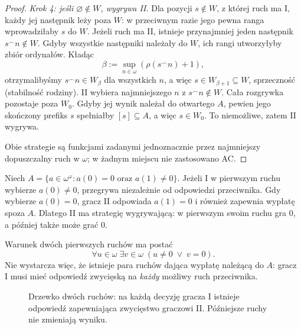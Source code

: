 \begin{proof}
\emph{Krok 4: jeśli $\varnothing\notin W$,
wygrywa II.}
Dla pozycji $s\notin W$, z której
ruch ma I, każdy jej następnik
leży poza $W$: w przeciwnym razie
jego pewna ranga wprowadziłaby
$s$ do $W$.
Jeżeli ruch ma II, istnieje
przynajmniej jeden następnik
$s^\frown n\notin W$.
Gdyby wszystkie następniki należały
do $W$, ich rangi utworzyłyby
zbiór ordynałów. Kładąc
\[
\beta:=\sup_{n\in\omega}
              (\rho(s^\frown n)+1),
\]
otrzymalibyśmy
$s^\frown n\in W_\beta$
dla wszystkich $n$, a więc
$s\in W_{\beta+1}\subseteq W$,
sprzeczność (stabilność rodziny).
II wybiera najmniejszego $n$
z $s^\frown n\notin W$.
Cała rozgrywka pozostaje poza $W_0$.
Gdyby jej wynik należał do
otwartego $A$, pewien jego
skończony prefiks $s$ spełniałby
$[s]\subseteq A$,
a więc $s\in W_0$.
To niemożliwe, zatem II wygrywa.

Obie strategie są funkcjami
zadanymi jednoznacznie przez
najmniejszy dopuszczalny ruch
w $\omega$; w żadnym miejscu
nie zastosowano AC.
\end{proof}

\begin{przyklad}
\label{ex:ad-two-step-quantifiers}
Niech
$A=\{a\in\omega^\omega:a(0)=0
\text{ oraz }a(1)\ne0\}$.
Jeżeli I w pierwszym ruchu wybierze
$a(0)\ne0$, przegrywa niezależnie od
odpowiedzi przeciwnika. Gdy wybierze
$a(0)=0$, gracz II odpowiada $a(1)=0$
i również zapewnia wypłatę spoza $A$.
Dlatego II ma strategię wygrywającą:
w pierwszym swoim ruchu gra $0$,
a później także może grać $0$.

Warunek dwóch pierwszych ruchów ma postać
\[
\forall u\in\omega\;\exists v\in\omega\;
   (u\ne0\;\lor\;v=0).
\]
Nie wystarcza więc, że istnieje para
ruchów dająca wypłatę należącą do $A$:
gracz I musi mieć odpowiedź zwycięską
na \emph{każdy} możliwy ruch przeciwnika.
\end{przyklad}
\begin{figure}[htbp]
\centering
{}
\caption{Drzewko dwóch ruchów: na każdą decyzję
gracza I istnieje odpowiedź zapewniająca
zwycięstwo graczowi II. Późniejsze ruchy
nie zmieniają wyniku.}
\label{fig:ad-two-moves}
\end{figure}

